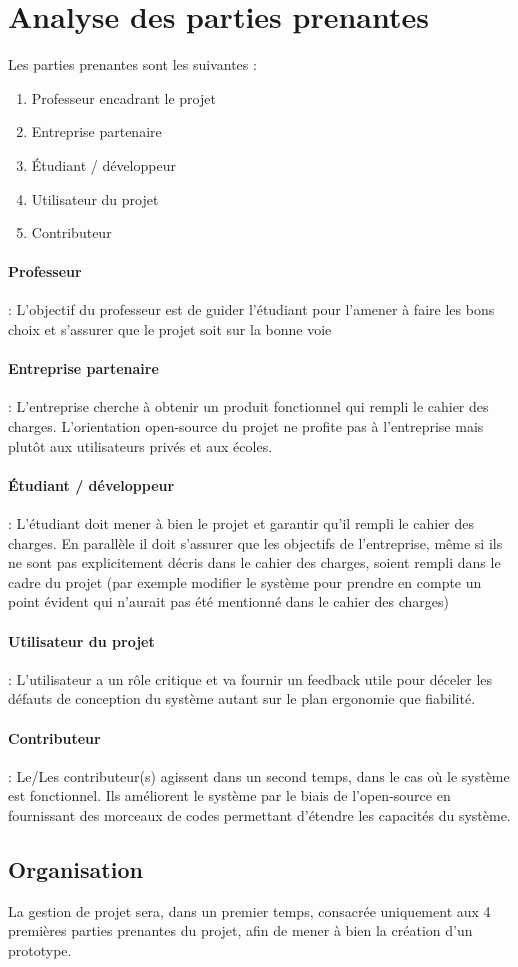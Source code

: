 \documentclass[AdvProjMgmt_Sebastien_Deriaz]{subfiles}
\begin{document}
\section{Analyse des parties prenantes}
Les parties prenantes sont les suivantes :
\begin{enumerate}
\item Professeur encadrant le projet
\item Entreprise partenaire
\item Étudiant / développeur
\item Utilisateur du projet
\item Contributeur
\end{enumerate}
\paragraph{Professeur} : L'objectif du professeur est de guider l'étudiant pour l'amener à faire les bons choix et s'assurer que le projet soit sur la bonne voie
\paragraph{Entreprise partenaire} : L'entreprise cherche à obtenir un produit fonctionnel qui rempli le cahier des charges. L'orientation open-source du projet ne profite pas à l'entreprise mais plutôt aux utilisateurs privés et aux écoles.
\paragraph{Étudiant / développeur} : L'étudiant doit mener à bien le projet et garantir qu'il rempli le cahier des charges. En parallèle il doit s'assurer que les objectifs de l'entreprise, même si ils ne sont pas explicitement décris dans le cahier des charges, soient rempli dans le cadre du projet (par exemple modifier le système pour prendre en compte un point évident qui n'aurait pas été mentionné dans le cahier des charges)
\paragraph{Utilisateur du projet} : L'utilisateur a un rôle critique et va fournir un feedback utile pour déceler les défauts de conception du système autant sur le plan ergonomie que fiabilité.
\paragraph{Contributeur} : Le/Les contributeur(s) agissent dans un second temps, dans le cas où le système est fonctionnel. Ils améliorent le système par le biais de l'open-source en fournissant des morceaux de codes permettant d'étendre les capacités du système.\\
\subsection{Organisation}
La gestion de projet sera, dans un premier temps, consacrée uniquement aux 4 premières parties prenantes du projet, afin de mener à bien la création d'un prototype.
\end{document}
